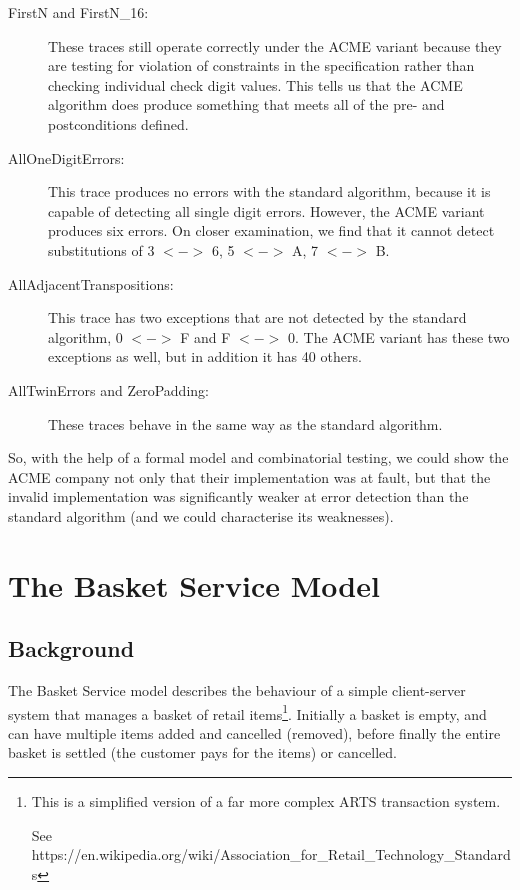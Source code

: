 \documentclass{overturerepchap}
\begin{document}
\begin{description}
  \item[FirstN and FirstN\_16:] These traces still operate correctly under the
  ACME variant because they are testing for violation of constraints in the
  specification rather than checking individual check digit values. This tells
  us that the ACME algorithm does produce something that meets all of the pre-
  and postconditions defined.
  \item[AllOneDigitErrors:] This trace produces no errors with the standard
  algorithm, because it is capable of detecting all single digit errors.
  However, the ACME variant produces six errors. On closer examination, we find
  that it cannot detect substitutions of 3 $<->$ 6, 5 $<->$ A, 7 $<->$ B.
  \item[AllAdjacentTranspositions:] This trace has two exceptions that are not
  detected by the standard algorithm, 0 $<->$ F and F $<->$ 0. The ACME variant
  has these two exceptions as well, but in addition it has 40 others.
  \item[AllTwinErrors and ZeroPadding:] These traces behave in the same way as
  the standard algorithm.
\end{description}

\noindent So, with the help of a formal model and combinatorial testing, we
could show the ACME company not only that their implementation was at fault, but
that the invalid implementation was significantly weaker at error detection
than the standard algorithm (and we could characterise its weaknesses).


\section{The Basket Service Model}

\subsection{Background}

The Basket Service model describes the behaviour of a simple client-server
system that manages a basket of retail items\footnote{This is a simplified
version of a far more complex ARTS transaction system.

See
https://en.wikipedia.org/wiki/Association\_for\_Retail\_Technology\_Standards}.
Initially a basket is empty, and can have multiple items added and cancelled
(removed), before finally the entire basket is settled (the customer pays for
the items) or cancelled.
\end{document}
